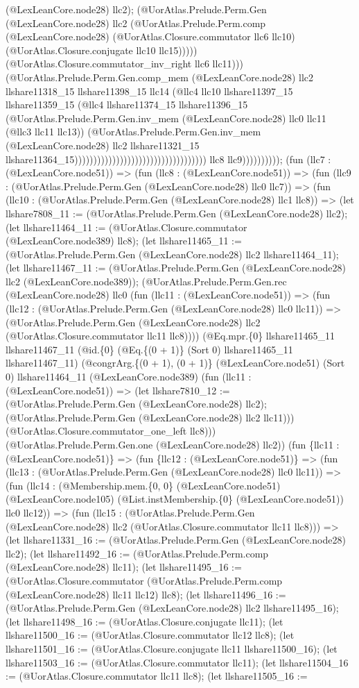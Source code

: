\documentclass[11pt]{article}
\begin{document}
(@LexLeanCore.node28) llc2); (@UorAtlas.Prelude.Perm.Gen (@LexLeanCore.node28) llc2 (@UorAtlas.Prelude.Perm.comp (@LexLeanCore.node28) (@UorAtlas.Closure.commutator llc6 llc10) (@UorAtlas.Closure.conjugate llc10 llc15))))) (@UorAtlas.Closure.commutator\_inv\_right llc6 llc11))) (@UorAtlas.Prelude.Perm.Gen.comp\_mem (@LexLeanCore.node28) llc2 llshare11318\_15 llshare11398\_15 llc14 (@llc4 llc10 llshare11397\_15 llshare11359\_15 (@llc4 llshare11374\_15 llshare11396\_15 (@UorAtlas.Prelude.Perm.Gen.inv\_mem (@LexLeanCore.node28) llc0 llc11 (@llc3 llc11 llc13)) (@UorAtlas.Prelude.Perm.Gen.inv\_mem (@LexLeanCore.node28) llc2 llshare11321\_15 llshare11364\_15))))))))))))))))))))))))))))))))))) llc8 llc9)))))))))); (fun (llc7 : (@LexLeanCore.node51)) => (fun (llc8 : (@LexLeanCore.node51)) => (fun (llc9 : (@UorAtlas.Prelude.Perm.Gen (@LexLeanCore.node28) llc0 llc7)) => (fun (llc10 : (@UorAtlas.Prelude.Perm.Gen (@LexLeanCore.node28) llc1 llc8)) => (let llshare7808\_11 := (@UorAtlas.Prelude.Perm.Gen (@LexLeanCore.node28) llc2); (let llshare11464\_11 := (@UorAtlas.Closure.commutator (@LexLeanCore.node389) llc8); (let llshare11465\_11 := (@UorAtlas.Prelude.Perm.Gen (@LexLeanCore.node28) llc2 llshare11464\_11); (let llshare11467\_11 := (@UorAtlas.Prelude.Perm.Gen (@LexLeanCore.node28) llc2 (@LexLeanCore.node389)); (@UorAtlas.Prelude.Perm.Gen.rec (@LexLeanCore.node28) llc0 (fun (llc11 : (@LexLeanCore.node51)) => (fun (llc12 : (@UorAtlas.Prelude.Perm.Gen (@LexLeanCore.node28) llc0 llc11)) => (@UorAtlas.Prelude.Perm.Gen (@LexLeanCore.node28) llc2 (@UorAtlas.Closure.commutator llc11 llc8)))) (@Eq.mpr.\{0\} llshare11465\_11 llshare11467\_11 (@id.\{0\} (@Eq.\{(0 + 1)\} (Sort 0) llshare11465\_11 llshare11467\_11) (@congrArg.\{(0 + 1), (0 + 1)\} (@LexLeanCore.node51) (Sort 0) llshare11464\_11 (@LexLeanCore.node389) (fun (llc11 : (@LexLeanCore.node51)) => (let llshare7810\_12 := (@UorAtlas.Prelude.Perm.Gen (@LexLeanCore.node28) llc2); (@UorAtlas.Prelude.Perm.Gen (@LexLeanCore.node28) llc2 llc11))) (@UorAtlas.Closure.commutator\_one\_left llc8))) (@UorAtlas.Prelude.Perm.Gen.one (@LexLeanCore.node28) llc2)) (fun \{llc11 : (@LexLeanCore.node51)\} => (fun \{llc12 : (@LexLeanCore.node51)\} => (fun (llc13 : (@UorAtlas.Prelude.Perm.Gen (@LexLeanCore.node28) llc0 llc11)) => (fun (llc14 : (@Membership.mem.\{0, 0\} (@LexLeanCore.node51) (@LexLeanCore.node105) (@List.instMembership.\{0\} (@LexLeanCore.node51)) llc0 llc12)) => (fun (llc15 : (@UorAtlas.Prelude.Perm.Gen (@LexLeanCore.node28) llc2 (@UorAtlas.Closure.commutator llc11 llc8))) => (let llshare11331\_16 := (@UorAtlas.Prelude.Perm.Gen (@LexLeanCore.node28) llc2); (let llshare11492\_16 := (@UorAtlas.Prelude.Perm.comp (@LexLeanCore.node28) llc11); (let llshare11495\_16 := (@UorAtlas.Closure.commutator (@UorAtlas.Prelude.Perm.comp (@LexLeanCore.node28) llc11 llc12) llc8); (let llshare11496\_16 := (@UorAtlas.Prelude.Perm.Gen (@LexLeanCore.node28) llc2 llshare11495\_16); (let llshare11498\_16 := (@UorAtlas.Closure.conjugate llc11); (let llshare11500\_16 := (@UorAtlas.Closure.commutator llc12 llc8); (let llshare11501\_16 := (@UorAtlas.Closure.conjugate llc11 llshare11500\_16); (let llshare11503\_16 := (@UorAtlas.Closure.commutator llc11); (let llshare11504\_16 := (@UorAtlas.Closure.commutator llc11 llc8); (let llshare11505\_16 := 
\end{document}

